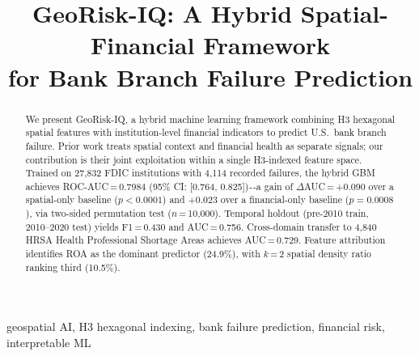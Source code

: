 \documentclass[conference]{IEEEtran}
\begin{document}
\title{GeoRisk-IQ: A Hybrid Spatial-Financial Framework\\
for Bank Branch Failure Prediction}
\author{
}
\maketitle
\begin{abstract}
We present GeoRisk-IQ, a hybrid machine learning framework combining
H3 hexagonal spatial features with institution-level financial indicators
to predict U.S.\ bank branch failure. Prior work treats spatial context
and financial health as separate signals; our contribution is their joint
exploitation within a single H3-indexed feature space. Trained on 27,832
FDIC institutions with 4,114 recorded failures, the hybrid GBM achieves
ROC-AUC\,=\,0.7984 (95\% CI: [0.764, 0.825]) - -a gain of
$\Delta$AUC\,=\,+0.090 over a spatial-only baseline ($p < 0.0001$) and
+0.023 over a financial-only baseline ($p = 0.0008$), via two-sided
permutation test ($n$\,=\,10,000). Temporal holdout (pre-2010 train,
2010–2020 test) yields F1\,=\,0.430 and AUC\,=\,0.756. Cross-domain
transfer to 4,840 HRSA Health Professional Shortage Areas achieves
AUC\,=\,0.729. Feature attribution identifies ROA as the dominant
predictor (24.9\%), with $k$\,=\,2 spatial density ratio ranking
third (10.5\%).
\end{abstract}
\begin{IEEEkeywords}
geospatial AI, H3 hexagonal indexing, bank failure prediction, financial
risk, interpretable ML
\end{IEEEkeywords}
\end{document}
